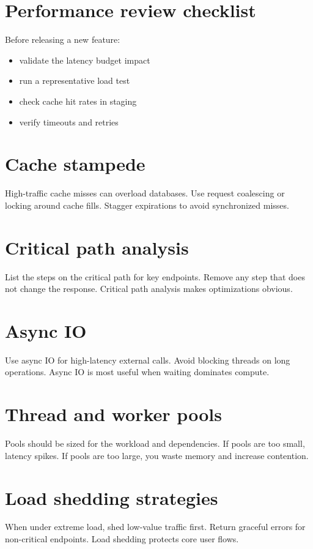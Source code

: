 \section{Performance review checklist}
Before releasing a new feature:
\begin{itemize}[nosep]
  \item validate the latency budget impact
  \item run a representative load test
  \item check cache hit rates in staging
  \item verify timeouts and retries
\end{itemize}

\section{Cache stampede}
High-traffic cache misses can overload databases.
Use request coalescing or locking around cache fills.
Stagger expirations to avoid synchronized misses.

\section{Critical path analysis}
List the steps on the critical path for key endpoints.
Remove any step that does not change the response.
Critical path analysis makes optimizations obvious.

\section{Async IO}
Use async IO for high-latency external calls.
Avoid blocking threads on long operations.
Async IO is most useful when waiting dominates compute.

\section{Thread and worker pools}
Pools should be sized for the workload and dependencies.
If pools are too small, latency spikes.
If pools are too large, you waste memory and increase contention.

\section{Load shedding strategies}
When under extreme load, shed low-value traffic first.
Return graceful errors for non-critical endpoints.
Load shedding protects core user flows.

